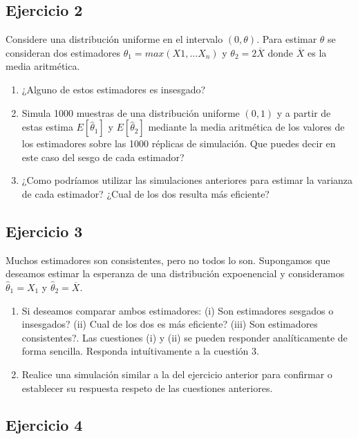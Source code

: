 \documentclass[
]{article}
\providecommand{\tightlist}{%
  \setlength{\itemsep}{0pt}\setlength{\parskip}{0pt}}
\begin{document}
\subsection{Ejercicio 2}\label{ejercicio-2-2}

Considere una distribución uniforme en el intervalo \((0, \theta)\). Para estimar \(\theta\) se consideran dos estimadores \(\theta_1 = max(X1,...X_n)\) y \(\theta_2 = 2 \overline{X}\) donde \(\overline{X}\) es la media aritmética.

\begin{enumerate}
\def\labelenumi{\alph{enumi}.}
\tightlist
\item
  ¿Alguno de estos estimadores es insesgado?
\item
  Simula 1000 muestras de una distribución uniforme \((0,1)\) y a partir de estas estima \(E[\hat \theta_1]\) y \(E[\hat \theta_2 ]\) mediante la media aritmética de los valores de los estimadores sobre las 1000 réplicas de simulación. Que puedes decir en este caso del sesgo de cada estimador?
\item
  ¿Como podríamos utilizar las simulaciones anteriores para estimar la varianza de cada estimador? ¿Cual de los dos resulta más eficiente?
\end{enumerate}

\subsection{Ejercicio 3}\label{ejercicio-3-2}

Muchos estimadores son consistentes, pero no todos lo son. Supongamos que deseamos estimar la esperanza de una distribución expoenencial y consideramos \(\hat \theta_1 = X_1\) y \(\hat\theta_2=\overline{X}\).

\begin{enumerate}
\def\labelenumi{\alph{enumi}.}
\tightlist
\item
  Si deseamos comparar ambos estimadores: (i) Son estimadores sesgados o insesgados? (ii) Cual de los dos es más eficiente? (iii) Son estimadores consistentes?. Las cuestiones (i) y (ii) se pueden responder analíticamente de forma sencilla. Responda intuítivamente a la cuestión 3.
\item
  Realice una simulación similar a la del ejercicio anterior para confirmar o establecer su respuesta respeto de las cuestiones anteriores.
\end{enumerate}

\subsection{Ejercicio 4}\label{ejercicio-4-1}
\end{document}
